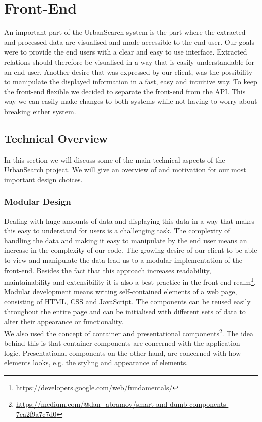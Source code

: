 \section{Front-End}\label{sec:5-front-end}
An important part of the UrbanSearch system is the part where the extracted and processed data are visualised and made accessible to the end user. Our goals were to provide the end users with a clear and easy to use interface. Extracted relations should therefore be visualised in a way that is easily understandable for an end user. Another desire that was expressed by our client, was the possibility to manipulate the displayed information in a fast, easy and intuitive way. To keep the front-end flexible we decided to separate the front-end from the API. This way we can easily make changes to both systems while not having to worry about breaking either system.

\subsection{Technical Overview}
In this section we will discuss some of the main technical aspects of the UrbanSearch project. We will give an overview of and motivation for our most important design choices.

\subsubsection{Modular Design}
Dealing with huge amounts of data and displaying this data in a way that makes this easy to understand for users is a challenging task. The complexity of handling the data and making it easy to manipulate by the end user means an increase in the complexity of our code. The growing desire of our client to be able to view and manipulate the data lead us to a modular implementation of the front-end.
Besides the fact that this approach increases readability, maintainability and extensibility it is also a best practice in the front-end realm\footnote{\url{https://developers.google.com/web/fundamentals/}}.\\
Modular development means writing self-contained elements of a web page, consisting of HTML, CSS and JavaScript. The components can be reused easily throughout the entire page and can be initialised with different sets of data to alter their appearance or functionality.\\
We also used the concept of container and presentational components\footnote{\url{https://medium.com/@dan_abramov/smart-and-dumb-components-7ca2f9a7c7d0}}. The idea behind this is that container components are concerned with the application logic. Presentational components on the other hand, are concerned with how elements looks, e.g. the styling and appearance of elements.\\

